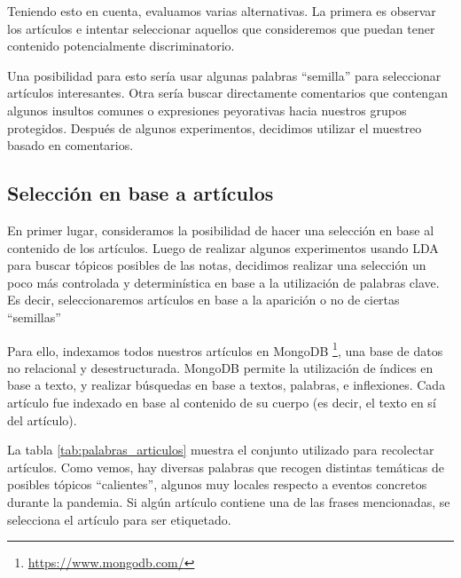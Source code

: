Teniendo esto en cuenta, evaluamos varias alternativas. La primera es observar los artículos e intentar seleccionar aquellos que consideremos que puedan tener contenido potencialmente discriminatorio.

Una posibilidad para esto sería usar algunas palabras ``semilla'' para seleccionar artículos interesantes. Otra sería buscar directamente comentarios que contengan algunos insultos comunes o expresiones peyorativas hacia nuestros grupos protegidos. Después de algunos experimentos, decidimos utilizar el muestreo basado en comentarios.

\subsection{Selección en base a artículos}

En primer lugar, consideramos la posibilidad de hacer una selección en base al contenido de los artículos. Luego de realizar algunos experimentos usando LDA \cite{blei2003latent} para buscar tópicos posibles de las notas, decidimos realizar una selección un poco más controlada y determinística en base a la utilización de palabras clave. Es decir, seleccionaremos artículos en base a la aparición o no de ciertas ``semillas''

Para ello, indexamos todos nuestros artículos en MongoDB \footnote{\url{https://www.mongodb.com/}}, una base de datos no relacional y desestructurada. MongoDB permite la utilización de índices en base a texto, y realizar búsquedas en base a textos, palabras, e inflexiones. Cada artículo fue indexado en base al contenido de su cuerpo (es decir, el texto en sí del artículo).

La tabla \ref{tab:palabras_articulos} muestra el conjunto utilizado para recolectar artículos. Como vemos, hay diversas palabras que recogen distintas temáticas de posibles tópicos ``calientes'', algunos muy locales respecto a eventos concretos durante la pandemia. Si algún artículo contiene una de las frases mencionadas, se selecciona el artículo para ser etiquetado.

